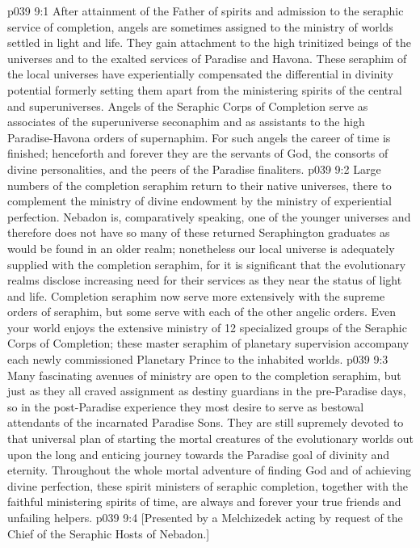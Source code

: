 \vs p039 9:1 After attainment of the Father of spirits and admission to the seraphic service of completion, angels are sometimes assigned to the ministry of worlds settled in light and life. They gain attachment to the high trinitized beings of the universes and to the exalted services of Paradise and Havona. These seraphim of the local universes have experientially compensated the differential in divinity potential formerly setting them apart from the ministering spirits of the central and superuniverses. Angels of the Seraphic Corps of Completion serve as associates of the superuniverse seconaphim and as assistants to the high Paradise\hyp{}Havona orders of supernaphim. For such angels the career of time is finished; henceforth and forever they are the servants of God, the consorts of divine personalities, and the peers of the Paradise finaliters.
\vs p039 9:2 Large numbers of the completion seraphim return to their native universes, there to complement the ministry of divine endowment by the ministry of experiential perfection. Nebadon is, comparatively speaking, one of the younger universes and therefore does not have so many of these returned Seraphington graduates as would be found in an older realm; nonetheless our local universe is adequately supplied with the completion seraphim, for it is significant that the evolutionary realms disclose increasing need for their services as they near the status of light and life. Completion seraphim now serve more extensively with the supreme orders of seraphim, but some serve with each of the other angelic orders. Even your world enjoys the extensive ministry of 12 specialized groups of the Seraphic Corps of Completion; these master seraphim of planetary supervision accompany each newly commissioned Planetary Prince to the inhabited worlds.
\vs p039 9:3 Many fascinating avenues of ministry are open to the completion seraphim, but just as they all craved assignment as destiny guardians in the pre\hyp{}Paradise days, so in the post\hyp{}Paradise experience they most desire to serve as bestowal attendants of the incarnated Paradise Sons. They are still supremely devoted to that universal plan of starting the mortal creatures of the evolutionary worlds out upon the long and enticing journey towards the Paradise goal of divinity and eternity. Throughout the whole mortal adventure of finding God and of achieving divine perfection, these spirit ministers of seraphic completion, together with the faithful ministering spirits of time, are always and forever your true friends and unfailing helpers.
\vsetoff
\vs p039 9:4 [Presented by a Melchizedek acting by request of the Chief of the Seraphic Hosts of Nebadon.]
\quizlink

